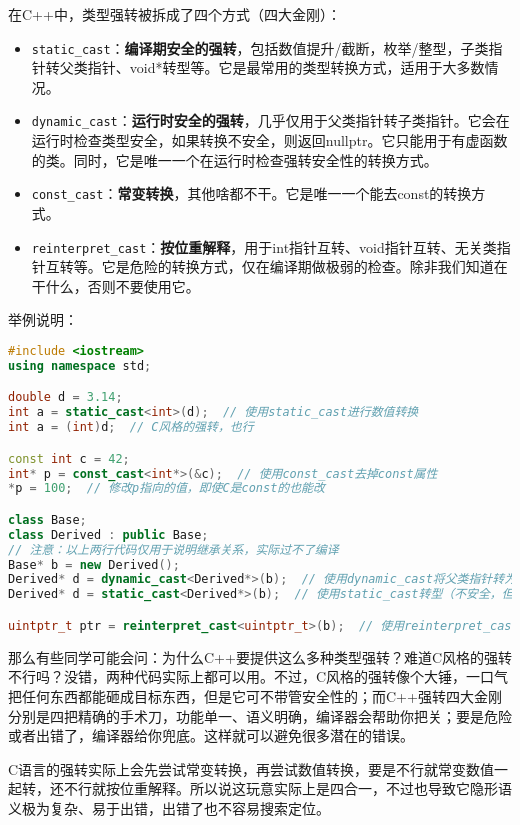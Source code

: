\documentclass[../main.tex]{subfiles}
\begin{document}
在C++中，类型强转被拆成了四个方式（四大金刚）：
\begin{itemize}
  \item \texttt{static\_cast}：\textbf{编译期安全的强转}，包括数值提升/截断，枚举/整型，子类指针转父类指针、void*转型等。它是最常用的类型转换方式，适用于大多数情况。
  \item \texttt{dynamic\_cast}：\textbf{运行时安全的强转}，几乎仅用于父类指针转子类指针。它会在运行时检查类型安全，如果转换不安全，则返回nullptr。它只能用于有虚函数的类。同时，它是唯一一个在运行时检查强转安全性的转换方式。
  \item \texttt{const\_cast}：\textbf{常变转换}，其他啥都不干。它是唯一一个能去const的转换方式。
  \item \texttt{reinterpret\_cast}：\textbf{按位重解释}，用于int指针互转、void指针互转、无关类指针互转等。它是危险的转换方式，仅在编译期做极弱的检查。除非我们知道在干什么，否则不要使用它。
\end{itemize}

举例说明：
\begin{lstlisting}[language=C++]
#include <iostream>
using namespace std;

double d = 3.14;
int a = static_cast<int>(d);  // 使用static_cast进行数值转换
int a = (int)d;  // C风格的强转，也行

const int c = 42;
int* p = const_cast<int*>(&c);  // 使用const_cast去掉const属性
*p = 100;  // 修改p指向的值，即使C是const的也能改

class Base;
class Derived : public Base; 
// 注意：以上两行代码仅用于说明继承关系，实际过不了编译
Base* b = new Derived();
Derived* d = dynamic_cast<Derived*>(b);  // 使用dynamic_cast将父类指针转为子类
Derived* d = static_cast<Derived*>(b);  // 使用static_cast转型（不安全，但是能过编译）

uintptr_t ptr = reinterpret_cast<uintptr_t>(b);  // 使用reinterpret_cast将指针转换为整数
\end{lstlisting}

那么有些同学可能会问：为什么C++要提供这么多种类型强转？难道C风格的强转不行吗？没错，两种代码实际上都可以用。不过，C风格的强转像个大锤，一口气把任何东西都能砸成目标东西，但是它可不带管安全性的；而C++强转四大金刚分别是四把精确的手术刀，功能单一、语义明确，编译器会帮助你把关；要是危险或者出错了，编译器给你兜底。这样就可以避免很多潜在的错误。

C语言的强转实际上会先尝试常变转换，再尝试数值转换，要是不行就常变数值一起转，还不行就按位重解释。所以说这玩意实际上是四合一，不过也导致它隐形语义极为复杂、易于出错，出错了也不容易搜索定位。
\end{document}
